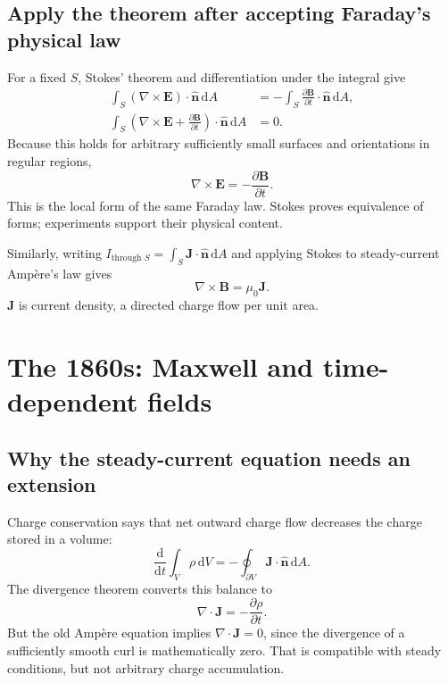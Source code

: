 \documentclass[11pt,letterpaper]{article}
\newcommand{\vect}[1]{\boldsymbol{#1}}
\newcommand{\dd}{\,\mathrm d}
\begin{document}
\subsection*{Apply the theorem after accepting Faraday's physical law}
For a fixed $S$, Stokes' theorem and differentiation under the integral give
\begin{align}
\int_S(\nabla\times\vect E)\cdot\hat{\vect n}\dd A
&=-\int_S\frac{\partial\vect B}{\partial t}\cdot\hat{\vect n}\dd A,\\
\int_S\left(\nabla\times\vect E+\frac{\partial\vect B}{\partial t}\right)
\cdot\hat{\vect n}\dd A&=0.
\end{align}
Because this holds for arbitrary sufficiently small surfaces and orientations in regular regions,
\begin{equation}
\boxed{\nabla\times\vect E=-\frac{\partial\vect B}{\partial t}.}
\end{equation}
This is the local form of the same Faraday law. Stokes proves equivalence of forms; experiments support their physical content.

Similarly, writing $I_{\text{through }S}=\int_S\vect J\cdot\hat{\vect n}\dd A$ and applying Stokes to steady-current Amp\`ere's law gives
\begin{equation}
\boxed{\nabla\times\vect B=\mu_0\vect J.}
\end{equation}
$\vect J$ is current density, a directed charge flow per unit area.

\newpage
\section{The 1860s: Maxwell and time-dependent fields}
\subsection*{Why the steady-current equation needs an extension}
Charge conservation says that net outward charge flow decreases the charge stored in a volume:
\[
\frac{\mathrm d}{\mathrm dt}\int_V\rho\dd V
=-\oint_{\partial V}\vect J\cdot\hat{\vect n}\dd A.
\]
The divergence theorem converts this balance to
\begin{equation}
\nabla\cdot\vect J=-\frac{\partial\rho}{\partial t}.
\end{equation}
But the old Amp\`ere equation implies $\nabla\cdot\vect J=0$, since the divergence of a sufficiently smooth curl is mathematically zero. That is compatible with steady conditions, but not arbitrary charge accumulation.
\end{document}

